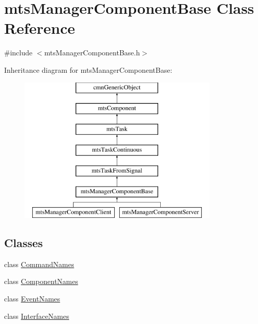 \hypertarget{classmts_manager_component_base}{}\section{mts\+Manager\+Component\+Base Class Reference}
\label{classmts_manager_component_base}


{\ttfamily \#include $<$mts\+Manager\+Component\+Base.\+h$>$}

Inheritance diagram for mts\+Manager\+Component\+Base\+:\begin{figure}[H]
\begin{center}
\leavevmode
\includegraphics[height=7.000000cm]{da/d32/classmts_manager_component_base}
\end{center}
\end{figure}
\subsection*{Classes}
\begin{DoxyCompactItemize}
\item 
class \hyperlink{classmts_manager_component_base_1_1_command_names}{Command\+Names}
\item 
class \hyperlink{classmts_manager_component_base_1_1_component_names}{Component\+Names}
\item 
class \hyperlink{classmts_manager_component_base_1_1_event_names}{Event\+Names}
\item 
class \hyperlink{classmts_manager_component_base_1_1_interface_names}{Interface\+Names}
\end{DoxyCompactItemize}

